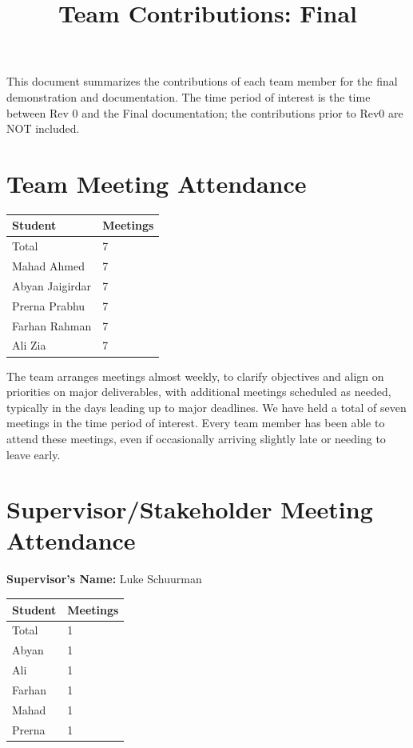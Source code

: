 \documentclass{article}
\title{Team Contributions: Final\\\progname}
\author{\authname}
\date{}
\begin{document}
\maketitle

This document summarizes the contributions of each team member for the final
demonstration and documentation.  The time period of interest is the time
between Rev 0 and the Final documentation; the contributions prior to Rev0 are
NOT included.

\section{Team Meeting Attendance}

\begin{table}[H]
\centering
\begin{tabular}{ll}
\toprule
\textbf{Student} & \textbf{Meetings}\\
\midrule
Total & 7\\
Mahad Ahmed & 7\\
Abyan Jaigirdar & 7\\
Prerna Prabhu & 7\\
Farhan Rahman & 7\\
Ali Zia & 7\\
\bottomrule
\end{tabular}
\end{table}

\noindent
The team arranges meetings almost weekly, to clarify objectives and align on priorities on major deliverables, with additional meetings scheduled as needed, typically in the days leading up to major deadlines. We have held a total of seven meetings in the time period of interest. Every team member has been able to attend these meetings, even if occasionally arriving slightly late or needing to leave early.

\section{Supervisor/Stakeholder Meeting Attendance}

\noindent \textbf{Supervisor's Name: } Luke Schuurman

\begin{table}[H]
\centering
\begin{tabular}{ll}
\toprule
\textbf{Student} & \textbf{Meetings}\\
\midrule
Total & 1\\
Abyan & 1\\
Ali & 1\\
Farhan & 1\\
Mahad & 1\\
Prerna & 1\\
\bottomrule
\end{tabular}
\end{table}
\end{document}
